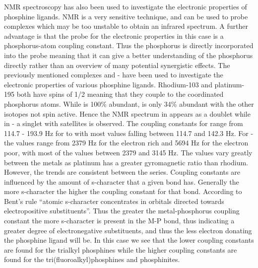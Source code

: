 \Gls{NMR} spectroscopy has also been used to investigate the electronic properties of phosphine ligands.  \phosphorus{} \gls{NMR} is a very sensitive technique, and can be used to probe complexes which may be too unstable to obtain an infrared spectrum.   A further advantage is that the probe for the electronic properties in this case is a phosphorus-atom coupling constant.  Thus the phosphorus is directly incorporated into the probe meaning that it can give a better understanding of the phosphorus directly rather than an overview of many potential synergistic effects.  The previously mentioned \ce{[Rh(CO)Cl(L)2]} complexes and \trans-\ce{[PtCl2L2]} have been used to investigate the electronic properties of various phosphine ligands.  Rhodium-103 and platinum-195 both have spins of 1/2 meaning that they couple to the coordinated phosphorus atoms.  While  is 100\% abundant, \Pt{} is only 34\% abundant with the other isotopes not spin active.  Hence the \phosphorus{} \gls{NMR} spectrum in \ce{[Rh(CO)Cl(L)2]} appears as a doublet while in \trans-\ce{[PtCl2L2]} a singlet with \Pt{} satellites is observed.  The coupling constants for \ce{[Rh(CO)Cl(L)2]} range from 114.7 - 193.9 Hz for  to  with most values falling between 114.7 and 142.3 Hz.  For \trans-\ce{[PtCl2L2]} the values range from 2379 Hz for the electron rich  and 5694 Hz for the electron poor,  with most  of the values between 2379 and 3145 Hz.  The values vary greatly between the metals as platinum has a greater gyromagnetic ratio than rhodium.\cite{Pregosin2012}  However, the trends are consistent between the series.  Coupling constants are influenced by the amount of s-character that a given bond has.  Generally the more s-character the higher the coupling constant for that bond.  According to Bent's rule ``atomic s-character concentrates in orbitals directed towards electropositive substituents''.  Thus the greater the metal-phosphorus coupling constant the more s-character is present in the M-P bond, thus indicating a greater degree of electronegative substituents, and thus the less electron donating the phosphine ligand will be.  In this case we see that the lower coupling constants are found for the trialkyl phosphines while the higher coupling constants are found for the tri(fluoroalkyl)phosphines and phosphinites.  


